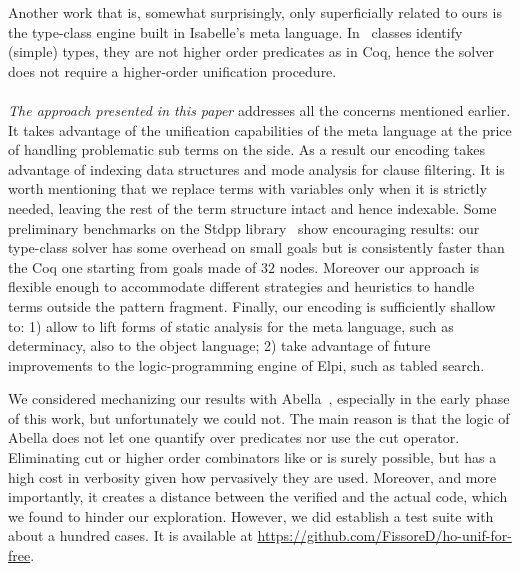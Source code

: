 \documentclass[sigconf,natbib=false,review]{acmart}
\def\githubUrl{\url{https://github.com/FissoreD/ho-unif-for-free}}
\begin{document}
Another work that is, somewhat surprisingly, only superficially related to ours is the
type-class engine built in Isabelle's meta language. In~\cite{wenzel97}
classes identify (simple) types, they are not higher order predicates
as in Coq, hence the solver does not require a higher-order unification
procedure.\\
~\\
\emph{The approach presented in this paper}
addresses all the concerns
mentioned earlier. It takes advantage of the
unification capabilities of the meta language
at the price of handling problematic sub terms on
the side.
As a result %
our encoding takes
advantage of indexing data structures and
mode analysis for clause filtering.
It is worth mentioning that we replace terms with variables only
when it is strictly needed, leaving the rest of the term structure intact
and hence indexable. %
Some preliminary benchmarks on the Stdpp
library~\cite{JUNG_KREBBERS_JOURDAN_BIZJAK_BIRKEDAL_DREYER_2018} show
encouraging results: our type-class solver has some
overhead on small goals but is consistently faster than
the Coq one starting from goals made of $32$ nodes.
Moreover our approach is flexible enough to accommodate different strategies
and heuristics to handle terms outside the pattern fragment.
Finally, our encoding is sufficiently shallow to: 1)
allow to lift forms of static analysis for
the meta language, such as determinacy, also to the object
language; 2) take advantage of future improvements to the
logic-programming engine of Elpi, such as tabled search.

We considered mechanizing our results with Abella~\cite{gacek2008abella},
especially in the early phase of this work, but unfortunately we could not.
The main reason is that the logic of Abella does not let one quantify over
predicates nor use the cut operator. Eliminating cut or
higher order
combinators like  or  is surely
possible, but 
has a high cost in verbosity given how pervasively they are used.
Moreover, and more importantly, it creates a distance
between the verified and the actual code, which we found to
hinder our exploration. However, we did establish a
test suite with about a hundred cases.
It is available at \githubUrl.





\printbibliography


% 
\end{document}

